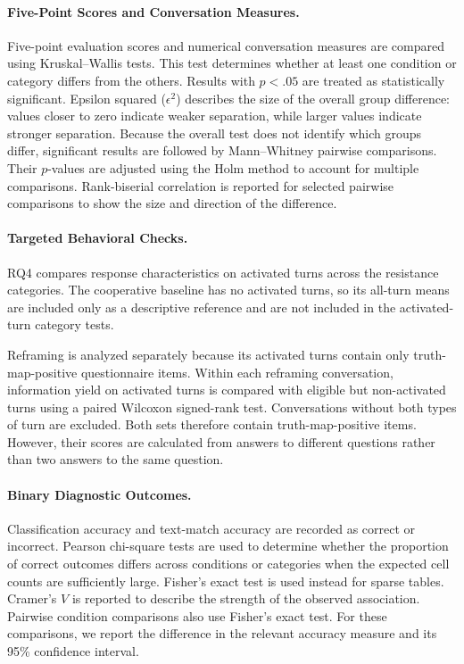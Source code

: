 \paragraph{Five-Point Scores and Conversation Measures.}
Five-point evaluation scores and numerical conversation measures are compared using Kruskal--Wallis tests. This test determines whether at least one condition or category differs from the others. Results with $p<.05$ are treated as statistically significant. Epsilon squared ($\epsilon^2$) describes the size of the overall group difference: values closer to zero indicate weaker separation, while larger values indicate stronger separation. Because the overall test does not identify which groups differ, significant results are followed by Mann--Whitney pairwise comparisons. Their $p$-values are adjusted using the Holm method to account for multiple comparisons. Rank-biserial correlation is reported for selected pairwise comparisons to show the size and direction of the difference.

\paragraph{Targeted Behavioral Checks.}
RQ4 compares response characteristics on activated turns across the resistance categories. The cooperative baseline has no activated turns, so its all-turn means are included only as a descriptive reference and are not included in the activated-turn category tests.

Reframing is analyzed separately because its activated turns contain only truth-map-positive questionnaire items. Within each reframing conversation, information yield on activated turns is compared with eligible but non-activated turns using a paired Wilcoxon signed-rank test. Conversations without both types of turn are excluded. Both sets therefore contain truth-map-positive items. However, their scores are calculated from answers to different questions rather than two answers to the same question.

\paragraph{Binary Diagnostic Outcomes.}
Classification accuracy and text-match accuracy are recorded as correct or incorrect. Pearson chi-square tests are used to determine whether the proportion of correct outcomes differs across conditions or categories when the expected cell counts are sufficiently large. Fisher's exact test is used instead for sparse tables. Cramer's $V$ is reported to describe the strength of the observed association. Pairwise condition comparisons also use Fisher's exact test. For these comparisons, we report the difference in the relevant accuracy measure and its 95\% confidence interval.


